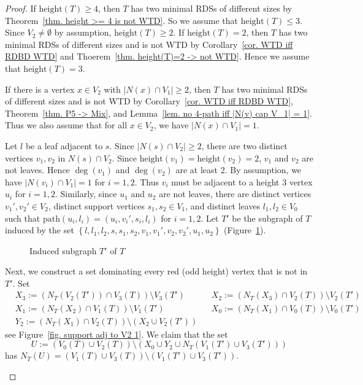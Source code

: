 \documentclass[10pt,a4paper]{amsart}
\newcommand{\hh}{\mbox{height}}
\newcommand{\pth}{\mbox{path}}
\newcommand\set[1]{\left\lbrace #1 \right\rbrace}
\begin{document}
\begin{proof}
    If $\hh(T) \geq 4$, then $T$ has two minimal RDSs of different sizes by Theorem~\ref{thm. height >= 4 is not WTD}.
    So we assume that $\hh(T) \leq 3$.
    Since $V_2 \neq \emptyset$ by assumption, $\hh(T) \geq 2$.
    If $\hh(T) = 2$, then $T$ has two minimal RDSs of different sizes and is not WTD by Corollary~\ref{cor. WTD iff RDBD WTD} and Thoerem~\ref{thm. height(T)=2 -> not WTD}.
    Hence we assume that $\hh(T) = 3$.
    
    If there is a vertex $x \in V_2$ with $|N(x) \cap V_1| \geq 2$, then $T$ has two minimal RDSs of different sizes and is not WTD by Corollary~\ref{cor. WTD iff RDBD WTD}, Theorem~\ref{thm. P5 -> Mix}, and Lemma~\ref{lem. no 4-path iff |N(v) cap V_1| = 1}.
    Thus we also assume that for all $x \in V_2$, we have $|N(x) \cap V_1| = 1$.

    Let $l$ be a leaf adjacent to $s$.
    Since $|N(s) \cap V_2| \geq 2$, there are two distinct vertices $v_1,v_2$ in $N(s) \cap V_2$.
    Since $\hh(v_1) = \hh(v_2) = 2$, $v_1$ and $v_2$ are not leaves.
    Hence $\deg(v_1)$ and $\deg(v_2)$ are at least 2.
    By assumption, we have $|N(v_i) \cap V_1| = 1$ for $i = 1,2$.
    Thus $v_i$ must be adjacent to a height 3 vertex $u_i$ for $i= 1,2$.
    Similarly, since $u_1$ and $u_2$ are not leaves, there are distinct vertices $v_1',v_2' \in V_2$, distinct support vertices $s_1,s_2 \in V_1$, and distinct leaves $l_1,l_2 \in V_0$ such that $\pth(u_i,l_i) = (u_i,v_i',s_i,l_i)$ for $i = 1,2$.
    Let $T'$ be the subgraph of $T$ induced by the set $\set{l,l_1,l_2,s,s_1,s_2,v_1,v_1',v_2,v_2',u_1,u_2}$  (Figure~\ref{Figure3}).
    \begin{figure}[ht]
    \centering
    
    \caption{Induced subgraph $T'$ of $T$}
    \label{Figure3}
    \end{figure}
    
    Next, we construct a set dominating every red (odd height) vertex that is not in $T'$.
    Set
    \begin{align*}
        &X_3 := (N_T(V_2(T')) \cap V_3(T)) \setminus V_3(T') & & X_2 := (N_T(X_3) \cap V_2(T)) \setminus V_2(T')\\
        &X_1 := (N_T(X_2) \cap V_1(T)) \setminus V_1(T') & & X_0 := (N_T(X_1) \cap V_0(T))\setminus V_0(T')\\ 
        &Y_2 := (N_T(X_1) \cap V_2(T)) \setminus (X_2 \cup V_2(T')) &&
    \end{align*}
 see Figure~\ref{fig. support adj to V2 1}. 
 We claim that the set 
    $$
    U := (V_0(T) \cup V_2(T)) \setminus (X_0 \cup Y_2 \cup N_T(V_1(T') \cup V_3(T')))
    $$ 
    has $N_T(U) = (V_1(T) \cup V_3(T)) \setminus (V_1(T') \cup V_3(T'))$.
    \begin{figure}[ht]
    \centering
    

\end{figure}
\end{proof}
\end{document}

